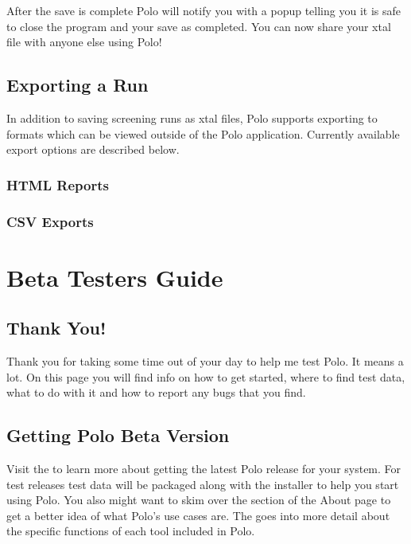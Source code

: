 \documentclass[letterpaper,10pt,english]{sphinxmanual}
\begin{document}
After the save is complete Polo will notify you with a popup telling you it
is safe to close the program and your save as completed. You can now share
your xtal file with anyone else using Polo!


\section{Exporting a Run}
\label{\detokenize{user_guide:exporting-a-run}}
In addition to saving screening runs as xtal files, Polo supports exporting
to formats which can be viewed outside of the Polo application. Currently
available export options are described below.


\subsection{HTML Reports}
\label{\detokenize{user_guide:html-reports}}

\subsection{CSV Exports}
\label{\detokenize{user_guide:csv-exports}}

\chapter{Beta Testers Guide}
\label{\detokenize{beta_testers:beta-testers-guide}}\label{\detokenize{beta_testers::doc}}

\section{Thank You!}
\label{\detokenize{beta_testers:thank-you}}
Thank you for taking some time out of your day to help me test Polo. It
means a lot. On this page you will find info on how to get started,
where to find test data, what to do with it and how to report any bugs that
you find.


\section{Getting Polo Beta Version}
\label{\detokenize{beta_testers:getting-polo-beta-version}}
Visit the {\hyperref[\detokenize{install:installation-guide}]{}} to learn more about getting the latest
Polo release for your system. For test releases test data will be packaged
along with the installer to help you start using Polo. You also might want to
skim over the {\hyperref[\detokenize{about:background}]{}} section of the About page to get a better idea
of what Polo’s use cases are. The {\hyperref[\detokenize{user_guide:user-s-guide}]{}} goes into more detail
about the specific functions of each tool included in Polo.
\end{document}
